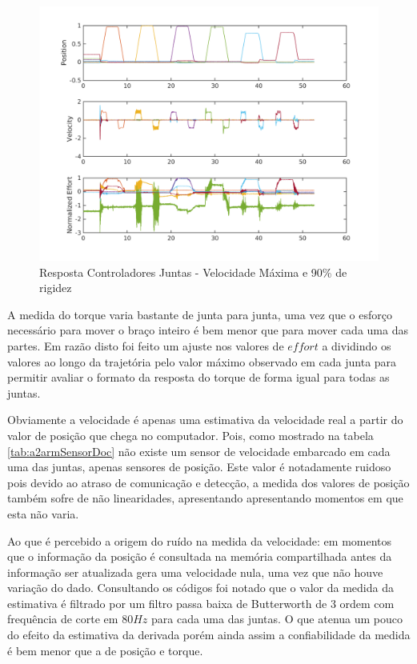 \vspace{1cm}
\begin{figure}[H]
    \centering
    \includegraphics[width = \linewidth]{tex/figs/jointIdentificationFullSpeed_stiff90p.png}
    \caption{Resposta Controladores Juntas - Velocidade Máxima e 90\% de rigidez}
    \label{fig:jointIdentificationFullSpeed_stiff90p}
\end{figure}

A medida do torque varia bastante de junta para junta, uma vez que o esforço necessário para mover o braço inteiro é bem menor que para mover cada uma das partes. Em razão disto foi feito um ajuste nos valores de $effort$ a dividindo os valores ao longo da trajetória pelo valor máximo observado em cada junta para permitir avaliar o formato da resposta do torque de forma igual para todas as juntas.

Obviamente a velocidade é apenas uma estimativa da velocidade real a partir do valor de posição que chega no computador. Pois, como mostrado na tabela \ref{tab:a2armSensorDoc} não existe um sensor de velocidade embarcado em cada uma das juntas, apenas sensores de posição. Este valor é notadamente ruidoso pois devido ao atraso de comunicação e detecção, a medida dos valores de posição também sofre de não linearidades, apresentando apresentando momentos em que esta não varia.

Ao que é percebido a origem do ruído na medida da velocidade: em momentos que o informação da posição é consultada na memória compartilhada antes da informação ser atualizada gera uma velocidade nula, uma vez que não houve variação do dado. Consultando os códigos foi notado que o valor da medida da estimativa é filtrado por um filtro passa baixa de Butterworth de 3 ordem com frequência de corte em $80 Hz$ para cada uma das juntas. O que atenua um pouco do efeito da estimativa da derivada porém ainda assim a confiabilidade da medida é bem menor que a de posição e torque.

